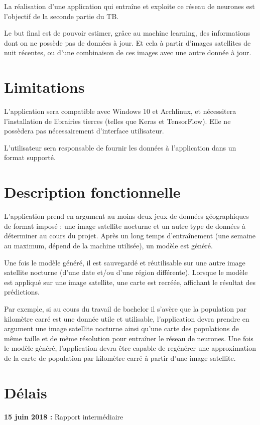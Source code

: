 \documentclass[a4paper, 11pt]{report}
\begin{document}
La réalisation d'une application qui entraîne et exploite ce réseau de neurones est l'objectif de la seconde partie du TB.

Le but final est de pouvoir estimer, grâce au machine learning, des informations dont on ne possède pas de données à jour. Et cela à partir d'images satellites de nuit récentes, ou d'une combinaison de ces images avec une autre donnée à jour.

\section{Limitations}
L'application sera compatible avec Windows 10 et Archlinux, et nécessitera l'installation de librairies tierces (telles que Keras et TensorFlow).
Elle ne possèdera pas nécessairement d'interface utilisateur.

L'utilisateur sera responsable de fournir les données à l'application dans un format supporté.

\section{Description fonctionnelle}
L'application prend en argument au moins deux jeux de données géographiques de format imposé : une image satellite nocturne et un autre type de données à déterminer au cours du projet. Après un long temps d'entraînement (une semaine au maximum, dépend de la machine utilisée), un modèle est généré.

Une fois le modèle généré, il est sauvegardé et réutilisable sur une autre image satellite nocturne (d'une date et/ou d'une région différente). Lorsque le modèle est appliqué sur une image satellite, une carte est recréée, affichant le résultat des prédictions.

Par exemple, si au cours du travail de bachelor il s'avère que la population par kilomètre carré est une donnée utile et utilisable, l'application devra prendre en argument une image satellite nocturne ainsi qu'une carte des populations de même taille et de même résolution pour entraîner le réseau de neurones. Une fois le modèle généré, l'application devra être capable de regénérer une approximation de la carte de population par kilomètre carré à partir d'une image satellite.

\section{Délais}
\textbf{15 juin 2018 :} Rapport intermédiaire
\end{document}
